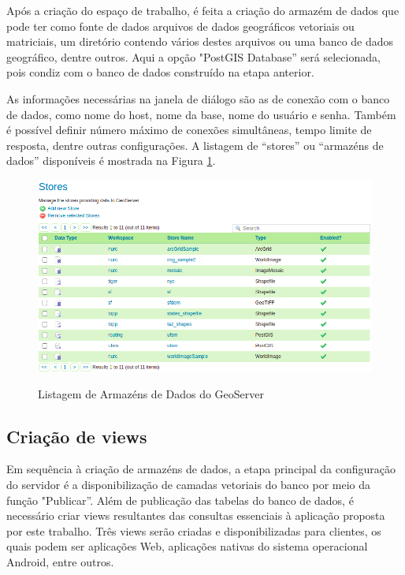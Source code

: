 \documentclass[oneside,openright,12pt]{ufsm_2015} %
\begin{document}
Após a criação do espaço de trabalho, é feita a criação do armazém de dados que pode ter como fonte de dados arquivos de dados geográficos vetoriais ou matriciais, um diretório contendo vários destes arquivos ou uma banco de dados geográfico, dentre outros. 
Aqui a opção "PostGIS Database'' será selecionada, pois condiz com o banco de dados construído na etapa anterior.

As informações necessárias na janela de diálogo são as de conexão com o banco de dados, como nome do host, nome da base, nome do usuário e senha.
Também é possível definir número máximo de conexões simultâneas, tempo limite de resposta, dentre outras configurações. A listagem de ``stores'' ou  ``armazéns de dados'' disponíveis é mostrada na Figura \ref{stores_geoserver}.

\begin{figure}[ht]
    \caption{Listagem de Armazéns de Dados do GeoServer}
    \centering
    \includegraphics[scale=0.4]{imagens/stores_geoserver.png}
    \label{stores_geoserver}
\end{figure}

\subsection{Criação de views}

Em sequência à criação de armazéns de dados, a etapa principal da configuração do servidor é a disponibilização de camadas vetoriais do banco por meio da função "Publicar''. 
Além de publicação das tabelas do banco de dados, é necessário criar views resultantes das consultas essenciais à aplicação proposta por este trabalho. 
Três views serão criadas e disponibilizadas para clientes, os quais podem ser aplicações Web, aplicações nativas do sistema operacional Android, entre outros. 
\end{document}
